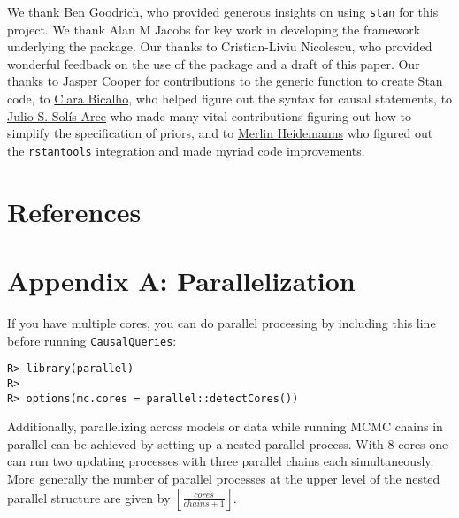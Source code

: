 \documentclass[
  11pt,
  article]{jss}
\begin{document}
\begin{tcolorbox}[enhanced jigsaw, opacityback=0, left=2mm, bottomrule=.15mm, toprule=.15mm, colback=white, breakable, arc=.35mm, rightrule=.15mm, leftrule=.75mm]

We thank Ben Goodrich, who provided generous insights on using
\texttt{stan} for this project. We thank Alan M Jacobs for key work in
developing the framework underlying the package. Our thanks to
Cristian-Liviu Nicolescu, who provided wonderful feedback on the use of
the package and a draft of this paper. Our thanks to Jasper Cooper for
contributions to the generic function to create Stan code, to
\href{https://clarabicalho.github.io/}{Clara Bicalho}, who helped figure
out the syntax for causal statements, to
\href{https://www.gov.harvard.edu/directory/julio-s-solis-arce/}{Julio
S. Solís Arce} who made many vital contributions figuring out how to
simplify the specification of priors, and to
\href{https://merlinheidemanns.github.io/website/}{Merlin Heidemanns}
who figured out the \texttt{rstantools} integration and made myriad code
improvements.

\end{tcolorbox}

\hypertarget{references}{%
\section*{References}\label{references}}

\renewcommand{\bibsection}{}


\newpage{}

\hypertarget{sec-parallel}{%
\section*{Appendix A: Parallelization}\label{sec-parallel}}

If you have multiple cores, you can do parallel processing by including
this line before running \texttt{CausalQueries}:

\begin{verbatim}
R> library(parallel)
R> 
R> options(mc.cores = parallel::detectCores())
\end{verbatim}

Additionally, parallelizing across models or data while running MCMC
chains in parallel can be achieved by setting up a nested parallel
process. With 8 cores one can run two updating processes with three
parallel chains each simultaneously. More generally the number of
parallel processes at the upper level of the nested parallel structure
are given by \(\left \lfloor \frac{cores}{chains + 1} \right \rfloor\).
\end{document}
